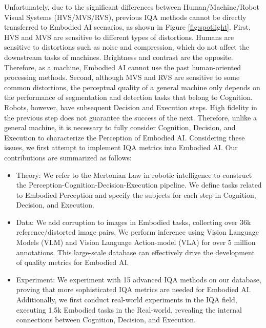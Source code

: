 \documentclass{article}
\begin{document}
Unfortunately, due to the significant differences between Human/Machine/Robot Visual Systems (HVS/MVS/RVS), previous IQA methods cannot be directly transferred to Embodied AI scenarios, as shown in Figure \ref{fig:spotlight}. First, HVS and MVS are sensitive to different types of distortions. Humans are sensitive to distortions such as noise and compression, which do not affect the downstream tasks of machines. Brightness and contrast are the opposite. Therefore, as a machine, Embodied AI cannot use the past human-oriented processing methods. Second, although MVS and RVS are sensitive to some common distortions, the perceptual quality of a general machine only depends on the performance of segmentation and detection tasks that belong to Cognition. Robots, however, have subsequent Decision and Execution steps. High fidelity in the previous step does not guarantee the success of the next. Therefore, unlike a general machine, it is necessary to fully consider Cognition, Decision, and Execution to characterize the Perception of Embodied AI. Considering these issues, we first attempt to implement IQA metrics into Embodied AI. Our contributions are summarized as follows:
\begin{itemize}
    \vspace{-2pt}
    \item Theory: We refer to the Mertonian Law in robotic intelligence to construct the Perception-Cognition-Decision-Execution pipeline. We define tasks related to Embodied Perception and specify the subjects for each step in Cognition, Decision, and Execution. 
    \item Data: We add corruption to images in Embodied tasks, collecting over 36k reference/distorted image pairs. We perform inference using Vision Language Models (VLM) and Vision Language Action-model (VLA) for over 5 million annotations. This large-scale database can effectively drive the development of quality metrics for Embodied AI.
    \item Experiment: We experiment with 15 advanced IQA methods on our database, proving that more sophisticated IQA metrics are needed for Embodied AI. Additionally, we first conduct real-world experiments in the IQA field, executing 1.5k Embodied tasks in the Real-world, revealing the internal connections between Cognition, Decision, and Execution.
    \vspace{-4pt}
\end{itemize}
 
\end{document}
